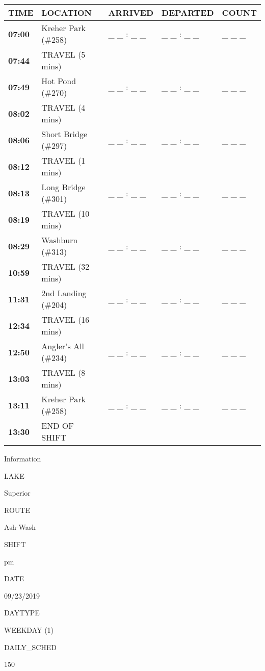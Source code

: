 \documentclass[]{article}
\begin{document}
\begin{tabular}{>{\bfseries}lllll}
\toprule
\textbf{TIME} & \textbf{LOCATION} & \textbf{ARRIVED} & \textbf{DEPARTED} & \textbf{COUNT}\\
\midrule
07:00 & Kreher Park (\#258) & \_ \_ : \_ \_ & \_ \_ : \_ \_ & \_ \_ \_\\
07:44 & TRAVEL (5 mins) &  &  & \\
07:49 & Hot Pond (\#270) & \_ \_ : \_ \_ & \_ \_ : \_ \_ & \_ \_ \_\\
08:02 & TRAVEL (4 mins) &  &  & \\
08:06 & Short Bridge (\#297) & \_ \_ : \_ \_ & \_ \_ : \_ \_ & \_ \_ \_\\
08:12 & TRAVEL (1 mins) &  &  & \\
08:13 & Long Bridge (\#301) & \_ \_ : \_ \_ & \_ \_ : \_ \_ & \_ \_ \_\\
08:19 & TRAVEL (10 mins) &  &  & \\
08:29 & Washburn (\#313) & \_ \_ : \_ \_ & \_ \_ : \_ \_ & \_ \_ \_\\
10:59 & TRAVEL (32 mins) &  &  & \\
11:31 & 2nd Landing (\#204) & \_ \_ : \_ \_ & \_ \_ : \_ \_ & \_ \_ \_\\
12:34 & TRAVEL (16 mins) &  &  & \\
12:50 & Angler's All (\#234) & \_ \_ : \_ \_ & \_ \_ : \_ \_ & \_ \_ \_\\
13:03 & TRAVEL (8 mins) &  &  & \\
13:11 & Kreher Park (\#258) & \_ \_ : \_ \_ & \_ \_ : \_ \_ & \_ \_ \_\\
13:30 & END OF SHIFT &  &  & \\
\bottomrule
\end{tabular}\newpage

Information

LAKE

Superior

ROUTE

Ash-Wash

SHIFT

pm

DATE

09/23/2019

DAYTYPE

WEEKDAY (1)

DAILY\_SCHED

150

\vspace{24pt}
\end{document}
